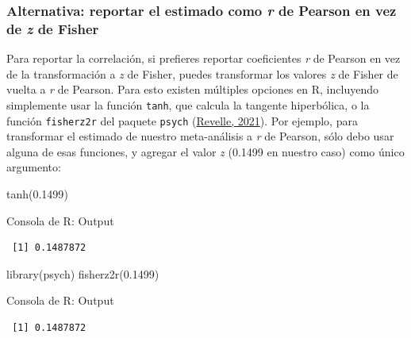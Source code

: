 \documentclass[
  bookmarksnumbered]{article}
\newenvironment{Shaded}{\begin{snugshade}}{\end{snugshade}}
\newcommand{\FloatTok}[1]{\textcolor[rgb]{0.69,0.50,0.00}{#1}}
\newcommand{\FunctionTok}[1]{\textcolor[rgb]{0.39,0.29,0.61}{#1}}
\newcommand{\NormalTok}[1]{\textcolor[rgb]{0.12,0.11,0.11}{#1}}
\begin{document}
\hypertarget{alternativa-reportar-el-estimado-como-r-de-pearson-en-vez-de-z-de-fisher}{%
\subsubsection{\texorpdfstring{Alternativa: reportar el estimado como \emph{r} de Pearson en vez de \emph{z} de Fisher}{Alternativa: reportar el estimado como r de Pearson en vez de z de Fisher}}\label{alternativa-reportar-el-estimado-como-r-de-pearson-en-vez-de-z-de-fisher}}

Para reportar la correlación, si prefieres reportar coeficientes \emph{r} de Pearson en vez de la transformación a \emph{z} de Fisher, puedes transformar los valores \emph{z} de Fisher de vuelta a \emph{r} de Pearson. Para esto existen múltiples opciones en R, incluyendo simplemente usar la función \texttt{tanh}, que calcula la tangente hiperbólica, o la función \texttt{fisherz2r} del paquete \texttt{psych} (\protect\hyperlink{ref-revellePsych2021}{Revelle, 2021}). Por ejemplo, para transformar el estimado de nuestro meta-análisis a \emph{r} de Pearson, sólo debo usar alguna de esas funciones, y agregar el valor \emph{z} (0.1499 en nuestro caso) como único argumento:

\begin{Shaded}
\begin{Highlighting}[]
\FunctionTok{tanh}\NormalTok{(}\FloatTok{0.1499}\NormalTok{)}
\end{Highlighting}
\end{Shaded}

\begin{ROut}{Consola de R: Output~\thetcbcounter}
                \begin{footnotesize}
                \begin{verbatim} [1] 0.1487872
 \end{verbatim}
                \end{footnotesize}
                \end{ROut}

\begin{Shaded}
\begin{Highlighting}[]
\FunctionTok{library}\NormalTok{(psych)}
\FunctionTok{fisherz2r}\NormalTok{(}\FloatTok{0.1499}\NormalTok{)}
\end{Highlighting}
\end{Shaded}

\begin{ROut}{Consola de R: Output~\thetcbcounter}
                \begin{footnotesize}
                \begin{verbatim} [1] 0.1487872
 \end{verbatim}
                \end{footnotesize}
                \end{ROut}
\end{document}

